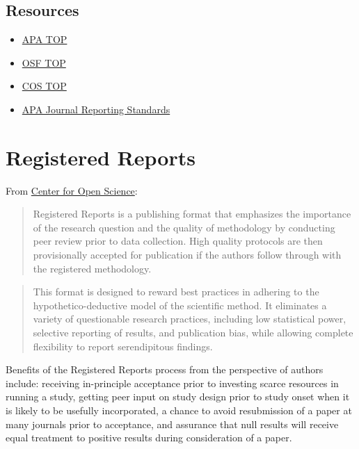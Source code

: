 \documentclass[
  oneside]{book}
\providecommand{\tightlist}{%
  \setlength{\itemsep}{0pt}\setlength{\parskip}{0pt}}
\begin{document}
\hypertarget{resources-6}{%
\section{Resources}\label{resources-6}}

\begin{itemize}
\tightlist
\item
  \href{https://www.apa.org/pubs/journals/resources/transparency-openness-promotion}{APA TOP}
\item
  \href{https://osf.io/9f6gx/}{OSF TOP}
\item
  \href{https://www.cos.io/initiatives/top-guidelines}{COS TOP}
\item
  \href{https://apastyle.apa.org/jars}{APA Journal Reporting Standards}
\end{itemize}

\hypertarget{authors-registered-reports}{%
\chapter{Registered Reports}\label{authors-registered-reports}}

From \href{https://www.cos.io/initiatives/registered-reports}{Center for Open Science}:

\begin{quote}
Registered Reports is a publishing format that emphasizes the importance of the research question and the quality of methodology by conducting peer review prior to data collection. High quality protocols are then provisionally accepted for publication if the authors follow through with the registered methodology.
\end{quote}

\begin{quote}
This format is designed to reward best practices in adhering to the hypothetico-deductive model of the scientific method. It eliminates a variety of questionable research practices, including low statistical power, selective reporting of results, and publication bias, while allowing complete flexibility to report serendipitous findings.
\end{quote}

Benefits of the Registered Reports process from the perspective of authors include: receiving in-principle acceptance prior to investing scarce resources in running a study, getting peer input on study design prior to study onset when it is likely to be usefully incorporated, a chance to avoid resubmission of a paper at many journals prior to acceptance, and assurance that null results will receive equal treatment to positive results during consideration of a paper.
\end{document}
